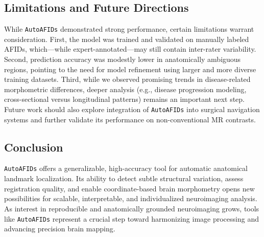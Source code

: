 \subsection{Limitations and Future Directions}

While \texttt{AutoAFIDs} demonstrated strong performance, certain limitations warrant consideration. First, the model was trained and validated on manually labeled AFIDs, which—while expert-annotated—may still contain inter-rater variability. Second, prediction accuracy was modestly lower in anatomically ambiguous regions, pointing to the need for model refinement using larger and more diverse training datasets. Third, while we observed promising trends in disease-related morphometric differences, deeper analysis (e.g., disease progression modeling, cross-sectional versus longitudinal patterns) remains an important next step. Future work should also explore integration of \texttt{AutoAFIDs} into surgical navigation systems and further validate its performance on non-conventional MR contrasts.

\subsection{Conclusion}

\texttt{AutoAFIDs} offers a generalizable, high-accuracy tool for automatic anatomical landmark localization. Its ability to detect subtle structural variation, assess registration quality, and enable coordinate-based brain morphometry opens new possibilities for scalable, interpretable, and individualized neuroimaging analysis. As interest in reproducible and anatomically grounded neuroimaging grows, tools like \texttt{AutoAFIDs} represent a crucial step toward harmonizing image processing and advancing precision brain mapping.



